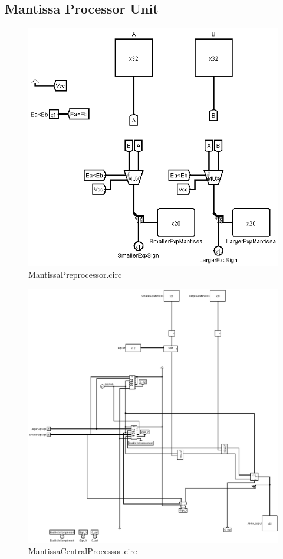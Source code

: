 \documentclass[18pt]{article}
\begin{document}
\subsection{Mantissa Processor Unit}
\begin{figure}[!h]
    \centering
    \captionsetup{font=Large}
    \includegraphics[scale=0.5]{Util/MantissaPreprocessor.png}
    \caption{MantissaPreprocessor.circ}
\end{figure}
\begin{figure}[!h]
    \centering
    \captionsetup{font=Large}
    \includegraphics[scale=0.2]{Util/MantissaCentralProcessor.png}
    \caption{MantissaCentralProcessor.circ}
\end{figure}
\end{document}
